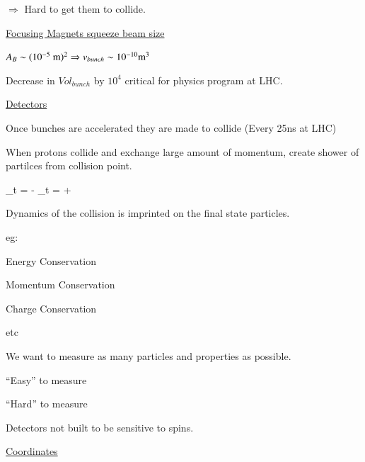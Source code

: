 {$\Rightarrow$ Hard to get them to collide.


\underline{Focusing Magnets squeeze beam size}

$A_B \sim (10^{-5}\ \textrm{m})^2 \Rightarrow v_{bunch} \sim 10^{-10} \textrm{m}^3$

Decrease in $Vol_{bunch}$ by $10^4$ critical for physics program at LHC.

\lineacross

\underline{Detectors}

Once bunches are accelerated they are made to collide (Every 25ns at LHC)

When protons collide and exchange large amount of momentum, create shower of partilces from collision point.

\be
{}_{t = -\infty} \rightarrow {}_{t = +\infty}
\ee

Dynamics of the collision is imprinted on the final state particles.

eg:
\bi
\item[-] Energy Conservation
\item[-] Momentum Conservation
\item[-] Charge Conservation 
\item[-] etc
\ei

We want to measure as many particles and properties as possible.

``Easy'' to measure 

``Hard'' to measure 

Detectors not built to be sensitive to spins.


\underline{Coordinates}

}
